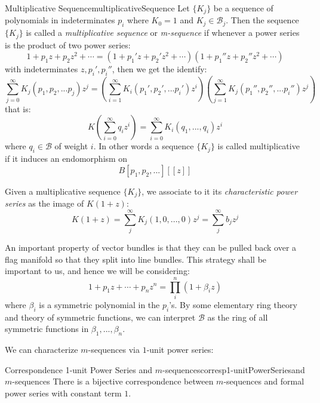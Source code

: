 \documentclass{book}
\newcommand{\CB}{{\mathcal{B}}}
\begin{document}
\begin{defn}{Multiplicative Sequence}{multiplicativeSequence}
  Let $\{K_j\}$ be a sequence of polynomials in indeterminates $p_i$ where $K_0 = 1$ and $K_j \in \CB_j$. Then
  the sequence $\{K_j\}$ is called a \emph{multiplicative sequence} or \emph{m-sequence} if whenever a power series is the product
  of two power series:
  \[
    1 + p_1z + p_2z^2  +\cdots = (1 + p_1'z + p_2'z^2  +\cdots)(1 + p_1''z + p_2''z^2  +\cdots)
  \]
  with indeterminates $z, p_i', p_i''$, then we get the identify:
  \[
    \sum_{j=0}^\infty K_j(p_1, p_2, ... p_j)z^j = \left(\sum_{i=1}^\infty K_i(p_1', p_2', ...
    p_i')z^i\right)\left(\sum_{j=1}^\infty K_j(p_1'', p_2'', ... p_i'')z^j\right)
  \]
  that is:
  \[
    K \left(\sum_{i=0}^\infty q_iz^i\right) = \sum_{i=0}^\infty K_i(q_1, ..., q_i)z^i
  \]
  where $q_i \in \CB$ of weight $i$. In other words a sequence $\{K_j\}$ is called multiplicative if it induces an endomorphism on
  \[
    B[p_1, p_2, ...]\left[[z]\right]
  \]
\end{defn}

Given a multiplicative sequence $\{K_j\}$, we associate to it its \emph{characteristic power series} as the
image of $K(1+z)$:
\[
  K(1+z) = \sum_j^\infty K_j(1, 0, ..., 0)z^j = \sum_j^\infty b_jz^j
\]

An important property of vector bundles is that they can be pulled back over a flag manifold so that they
split into line bundles. This strategy shall be important to us, and hence we will be considering:
\[
  1 + p_1z + \cdots + p_nz^n = \prod_i^n \left(1 + \beta_iz\right)
\]
where $\beta_i$ is a symmetric polynomial in the $p_i$'s. By some elementary ring theory and theory of
symmetric functions, we can interpret $\CB$ as the ring of all symmetric functions in $\beta_1, ..., \beta_n$.


We can characterize $m$-sequences via $1$-unit power series:

\begin{prop}{Correspondence 1-unit Power Series and $m$-sequences}{corresp1-unitPowerSeriesand$m$-sequences}
  There is a bijective correspondence between $m$-sequences and formal power series with constant term $1$.
\end{prop}
\end{document}

